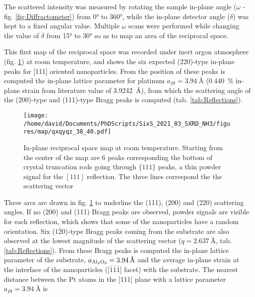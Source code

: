The scattered intensity was measured by rotating the sample in-plane angle ($\omega$ - fig. \ref{fig:Diffractometer}) from \ang{0} to \ang{360}, while the in-plane detector angle ($\delta$) was kept to a fixed angular value.
Multiple $\omega$ scans were performed while changing the value of $\delta$ from \ang{15} to \ang{30} so as to map an area of the reciprocal space.

This first map of the reciprocal space was recorded under inert argon atmosphere (fig. \ref{fig:QxQyMap}) at room temperature, and shows the six expected (220)-type in-plane peaks for [111] oriented nanoparticles.
From the position of these peaks is computed the in-plane lattice parameter for platinum $a_{Pt}=\qty{3.94}{\angstrom}$ (\qty{0.440}{\percent} in-plane strain from literature value of \qty{3.9242}{\angstrom}), from which the scattering angle of the (200)-type and (111)-type Bragg peaks is computed (tab. \ref{tab:Reflections}).

\begin{figure}[!htb]
    \centering
    \texttt{[image: /home/david/Documents/PhDScripts/SixS\_2021\_03\_SXRD\_NH3/figures/map/qxqyqz\_38\_40.pdf]}
    \caption{
        In-plane reciprocal space map at room temperature.
        Starting from the center of the map are 6 peaks corresponding the bottom of crystal truncation rods going through $\{111\}$ peaks, a thin powder signal for the $[111]$ reflection.
        The three lines correspond the the scattering vector
    }
    \label{fig:QxQyMap}
\end{figure}

Three arcs are drawn in fig. \ref{fig:QxQyMap} to underline the (111), (200) and (220) scattering angles.
If no (200) and (111) Bragg peaks are observed, powder signals are visible for each reflection, which shows that some of the nanoparticles have a random orientation.
Six (1$\bar{2}$0)-type Bragg peaks coming from the  substrate are also observed at the lowest magnitude of the scattering vector ($q = \qty{2.637}{\angstrom}$, tab. \ref{tab:Reflections}).
From these Bragg peaks is computed the in-plane lattice parameter of the substrate, $a_{\ce{Al_2O_3}}=\qty{3.94}{\angstrom}$ and the average in-plane strain at the interface of the nanoparticles ([$\bar{1}\bar{1}\bar{1}$] facet) with the substrate.
The nearest distance between the Pt atoms in the [111] plane with a lattice parameter $a_{Pt}=\qty{3.94}{\angstrom}$ is

